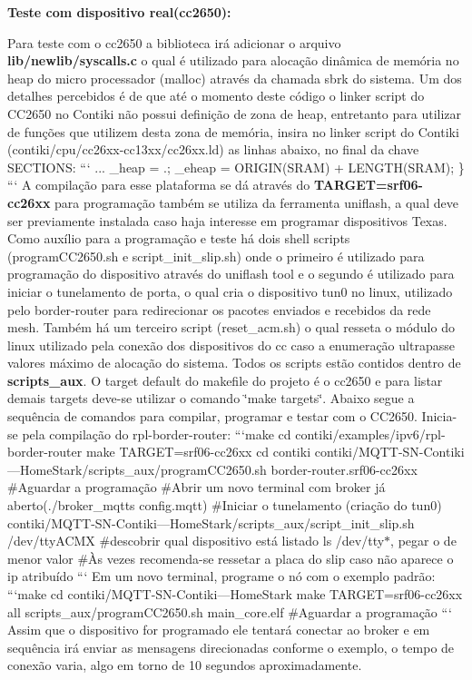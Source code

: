 {\bfseries Teste com dispositivo real(cc2650)\+:}

Para teste com o cc2650 a biblioteca irá adicionar o arquivo {\bfseries lib/newlib/syscalls.\+c} o qual é utilizado para alocação dinâmica de memória no heap do micro processador (malloc) através da chamada sbrk do sistema. Um dos detalhes percebidos é de que até o momento deste código o linker script do C\+C2650 no Contiki não possui definição de zona de heap, entretanto para utilizar de funções que utilizem desta zona de memória, insira no linker script do Contiki (contiki/cpu/cc26xx-\/cc13xx/cc26xx.\+ld) as linhas abaixo, no final da chave S\+E\+C\+T\+I\+O\+N\+S\+: ``` ... \+\_\+heap = .; \+\_\+eheap = O\+R\+I\+G\+I\+N(\+S\+R\+A\+M) + L\+E\+N\+G\+T\+H(\+S\+R\+A\+M); \} ``` A compilação para esse plataforma se dá através do {\bfseries T\+A\+R\+G\+E\+T=srf06-\/cc26xx} para programação também se utiliza da ferramenta uniflash, a qual deve ser previamente instalada caso haja interesse em programar dispositivos Texas. Como auxílio para a programação e teste há dois shell scripts (program\+C\+C2650.\+sh e script\+\_\+init\+\_\+slip.\+sh) onde o primeiro é utilizado para programação do dispositivo através do uniflash tool e o segundo é utilizado para iniciar o tunelamento de porta, o qual cria o dispositivo tun0 no linux, utilizado pelo border-\/router para redirecionar os pacotes enviados e recebidos da rede mesh. Também há um terceiro script (reset\+\_\+acm.\+sh) o qual resseta o módulo do linux utilizado pela conexão dos dispositivos do cc caso a enumeração ultrapasse valores máximo de alocação do sistema. Todos os scripts estão contidos dentro de {\bfseries scripts\+\_\+aux}. O target default do makefile do projeto é o cc2650 e para listar demais targets deve-\/se utilizar o comando \char`\"{}make targets\char`\"{}. Abaixo segue a sequência de comandos para compilar, programar e testar com o C\+C2650. Inicia-\/se pela compilação do rpl-\/border-\/router\+: ```make cd contiki/examples/ipv6/rpl-\/border-\/router make T\+A\+R\+G\+E\+T=srf06-\/cc26xx cd contiki contiki/\+M\+Q\+T\+T-\/\+S\+N-\/\+Contiki---Home\+Stark/scripts\+\_\+aux/program\+C\+C2650.\+sh border-\/router.\+srf06-\/cc26xx \#\+Aguardar a programação \#\+Abrir um novo terminal com broker já aberto(./broker\+\_\+mqtts config.\+mqtt) \#\+Iniciar o tunelamento (criação do tun0) contiki/\+M\+Q\+T\+T-\/\+S\+N-\/\+Contiki---Home\+Stark/scripts\+\_\+aux/script\+\_\+init\+\_\+slip.\+sh /dev/tty\+A\+C\+M\+X \#descobrir qual dispositivo está listado ls /dev/tty$\ast$, pegar o de menor valor \#Às vezes recomenda-\/se ressetar a placa do slip caso não aparece o ip atribuído ``` Em um novo terminal, programe o nó com o exemplo padrão\+: ```make cd contiki/\+M\+Q\+T\+T-\/\+S\+N-\/\+Contiki---Home\+Stark make T\+A\+R\+G\+E\+T=srf06-\/cc26xx all scripts\+\_\+aux/program\+C\+C2650.\+sh main\+\_\+core.\+elf \#\+Aguardar a programação ``` Assim que o dispositivo for programado ele tentará conectar ao broker e em sequência irá enviar as mensagens direcionadas conforme o exemplo, o tempo de conexão varia, algo em torno de 10 segundos aproximadamente.

